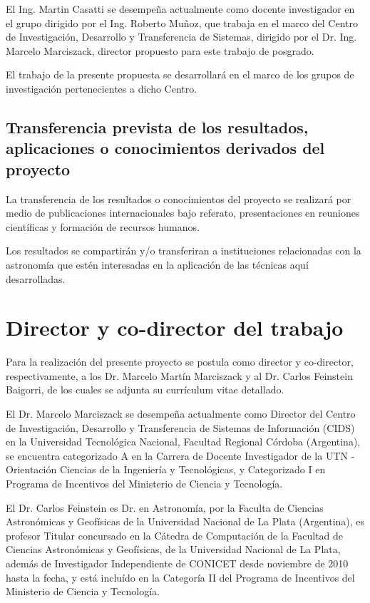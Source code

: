\documentclass[
	11pt,oneside,a4paper,
	headsepline,footsepline,
	fleqn,
]{memoir}
\begin{document}
El Ing. Martin Casatti se desempeña actualmente como docente investigador en el grupo dirigido por el Ing. Roberto Muñoz, que trabaja en el marco del Centro de Investigación, Desarrollo y Transferencia de Sistemas, dirigido por el Dr. Ing. Marcelo Marciszack, director propuesto para este trabajo de posgrado.

El trabajo de la presente propuesta se desarrollará en el marco de los grupos de investigación pertenecientes a dicho Centro.

\subsection{Transferencia prevista de los resultados, aplicaciones o conocimientos derivados del proyecto}

La transferencia de los resultados o conocimientos del proyecto se realizará por medio de publicaciones internacionales bajo referato, presentaciones en reuniones científicas y formación de recursos humanos.

Los resultados se compartirán y/o transferiran a instituciones relacionadas con la astronomía que estén interesadas en la aplicación de las técnicas aquí desarrolladas.

\section{Director y co-director del trabajo}

Para la realización del presente proyecto se postula como director y co-director, respectivamente, a los Dr. Marcelo Martín Marciszack y al Dr. Carlos Feinstein Baigorri, de los cuales se adjunta su currículum vitae detallado.

El Dr. Marcelo Marciszack se desempeña actualmente como Director del Centro de Investigación, Desarrollo y Transferencia de Sistemas de Información (CIDS) en la Universidad Tecnológica Nacional, Facultad Regional Córdoba (Argentina), se encuentra categorizado A en la Carrera de Docente Investigador de la UTN -
Orientación Ciencias de la Ingeniería y Tecnológicas, y Categorizado I
en Programa de Incentivos del Ministerio de Ciencia y Tecnología.

El Dr. Carlos Feinstein es Dr. en Astronomía, por la Faculta de Ciencias Astronómicas y Geofísicas de la Universidad Nacional de La Plata (Argentina), es profesor Titular concursado en la Cátedra de Computación de la Facultad de Ciencias Astronómicas y Geofísicas, de la Universidad Nacional de La Plata, además de Investigador Independiente de CONICET desde noviembre de 2010 hasta la fecha, y está incluído en la Categoría II del Programa de Incentivos del Ministerio de Ciencia y Tecnología.
\end{document}
